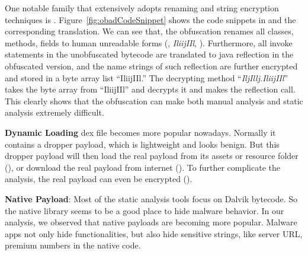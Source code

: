One notable family that extensively adopts renaming and string encryption
techniques is .
Figure~\ref{fig:obadCodeSnippet} shows the code snippets
in  and the corresponding translation.
We can see that, the obfuscation renames all classes, methods, fields to 
human unreadable forms (, {\em IliijIIl}, \etc).
Furthermore, all invoke statements
in the unobfuscated bytecode are translated to java reflection in the obfuscated version, 
and the name strings of such reflection are further encrypted and stored in a byte array 
list ``IliijIIl.''
The decrypting method ``{\em IljIllj.IliijIIl}'' takes the byte array from ``IliijIIl'' and
decrypts it and makes the reflection call.
This clearly shows that the obfuscation can make both manual analysis
and static analysis extremely difficult.


{\bf Dynamic Loading} dex file becomes more popular nowadays. 
Normally it contains a dropper payload, which is lightweight
and looks benign.
But this dropper payload will then load the real
payload from its assets or resource folder (\eg {}), 
or download the real payload from internet (\eg {}).
To further complicate the analysis, the real payload can even be encrypted (\eg {}).


{\bf Native Payload}: Most of the static analysis tools focus on Dalvik bytecode.
So the native
library seems to be a good place to hide malware behavior.
In our analysis, we observed that native payloads are becoming
more popular. Malware apps not only hide functionalities,
but also hide sensitive strings, like server URL, premium numbers in the native code.


